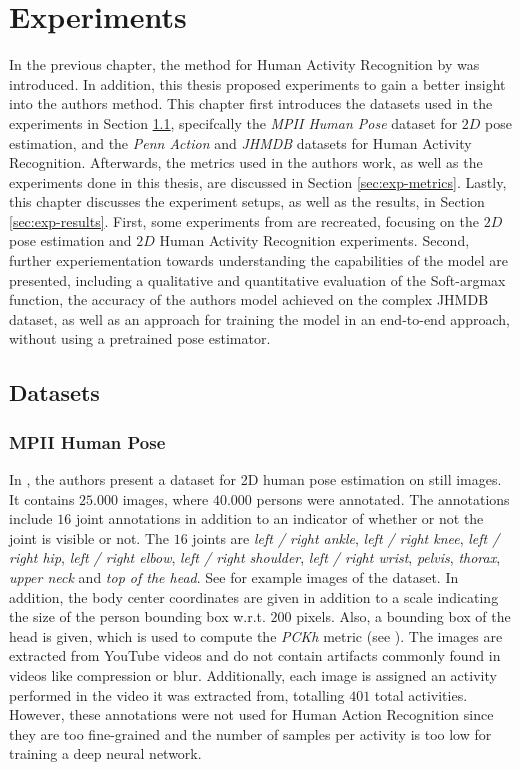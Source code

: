 \chapter{Experiments}
\label{sec:chapter5}
In the previous chapter, the method for Human Activity Recognition by \cite{luvizon_2d/3d_2018} was introduced.
In addition, this thesis proposed experiments to gain a better insight into the authors method.
This chapter first introduces the datasets used in the experiments in Section \ref{sec:exp-datasets}, specifcally the \textit{MPII Human Pose} dataset for $2D$ pose estimation, and the \textit{Penn Action} and \textit{JHMDB} datasets for Human Activity Recognition.
Afterwards, the metrics used in the authors work, as well as the experiments done in this thesis, are discussed in Section \ref{sec:exp-metrics}.
Lastly, this chapter discusses the experiment setups, as well as the results, in Section \ref{sec:exp-results}.
First, some experiments from \cite{luvizon_2d/3d_2018} are recreated, focusing on the $2D$ pose estimation and $2D$ Human Activity Recognition experiments.
Second, further experiementation towards understanding the capabilities of the model are presented, including a qualitative and quantitative evaluation of the Soft-argmax function, the accuracy of the authors model achieved on the complex JHMDB dataset, as well as an approach for training the model in an end-to-end approach, without using a pretrained pose estimator.

\section{Datasets}
\label{sec:exp-datasets}

\subsection{MPII Human Pose}
\label{sec:exp-mpii}

In \cite{andriluka_2d_2014}, the authors present a dataset for 2D human pose estimation on still images.
It contains $25.000$ images, where $40.000$ persons were annotated.
The annotations include $16$ joint annotations in addition to an indicator of whether or not the joint is visible or not.
The $16$ joints are \textit{left / right ankle}, \textit{left / right knee}, \textit{left / right hip}, \textit{left / right elbow}, \textit{left / right shoulder}, \textit{left / right wrist}, \textit{pelvis}, \textit{thorax}, \textit{upper neck} and \textit{top of the head}.
See  for example images of the dataset.
In addition, the body center coordinates are given in addition to a scale indicating the size of the person bounding box w.r.t. $200$ pixels.
Also, a bounding box of the head is given, which is used to compute the \textit{PCKh} metric (see ).
The images are extracted from YouTube videos and do not contain artifacts commonly found in videos like compression or blur.
Additionally, each image is assigned an activity performed in the video it was extracted from, totalling $401$ total activities.
However, these annotations were not used for Human Action Recognition since they are too fine-grained and the number of samples per activity is too low for training a deep neural network.

